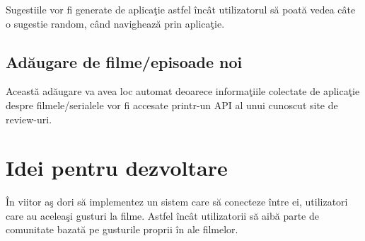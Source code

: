 \documentclass[a4paper]{article}
\begin{document}
Sugestiile vor fi generate de aplicaţie astfel încât utilizatorul să poată vedea câte o sugestie random, când navighează prin aplicaţie. 

\subsection{Adăugare de filme/episoade noi}

Această adăugare va avea loc automat deoarece informaţiile colectate de aplicaţie despre filmele/serialele vor fi accesate printr-un API al unui cunoscut site de review-uri.

\section{Idei pentru dezvoltare}

În viitor aş dori să implementez un sistem care să conecteze între ei, utilizatori care au aceleaşi gusturi la filme. Astfel încât utilizatorii să aibă parte de comunitate bazată pe gusturile proprii în ale filmelor.
\end{document}

